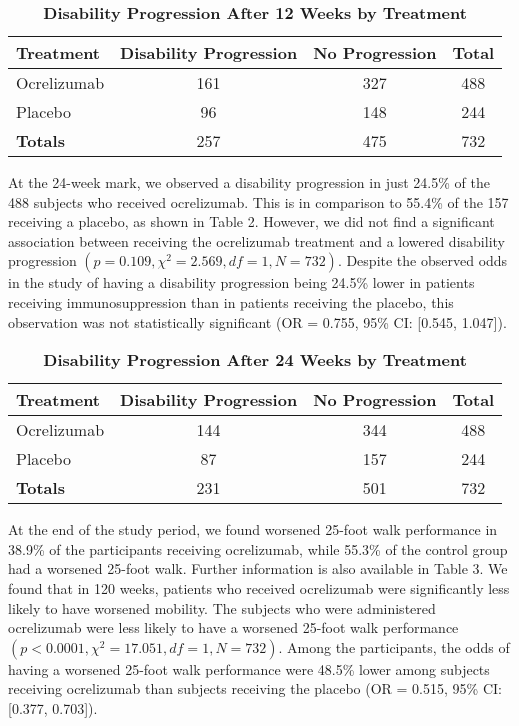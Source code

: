 \documentclass{article}
\begin{document}
	\begin{table}[h]
		\centering
		\footnotesize
		\caption{\textbf{Disability Progression After 12 Weeks by Treatment}}
		\renewcommand{\arraystretch}{1.2}
		\begin{tabular}{lcc|c}
			\toprule
			\textbf{Treatment} & \textbf{Disability Progression} & \textbf{No Progression} & \textbf{Total} \\
			\midrule
			Ocrelizumab & 161 & 327 & 488 \\
			Placebo & 96 & 148 & 244 \\
			\midrule
			\textbf{Totals} & 257 & 475 & 732 \\
			\bottomrule
		\end{tabular}
	\end{table}

	At the 24-week mark, we observed a disability progression in just 24.5\% of the 488 subjects who received ocrelizumab. This is in comparison to 55.4\% of the 157 receiving a placebo, as shown in Table 2. However, we did not find a significant association between receiving the ocrelizumab treatment and a lowered disability progression $(p = 0.109, \chi^2 = 2.569, df = 1, N = 732)$. Despite the observed odds in the study of having a disability progression being 24.5\% lower in patients receiving immunosuppression than in patients receiving the placebo, this observation was not statistically significant (OR = 0.755, 95\% CI: [0.545, 1.047]).

	\newpage

	\begin{table}[h]
		\centering
		\footnotesize
		\caption{\textbf{Disability Progression After 24 Weeks by Treatment}}
		\renewcommand{\arraystretch}{1.2}
		\begin{tabular}{lcc|c}
			\toprule
			\textbf{Treatment} & \textbf{Disability Progression} & \textbf{No Progression} & \textbf{Total} \\
			\midrule
			Ocrelizumab & 144 & 344 & 488 \\
			Placebo & 87 & 157 & 244 \\
			\midrule
			\textbf{Totals} & 231 & 501 & 732 \\
			\bottomrule
		\end{tabular}
	\end{table}

	At the end of the study period, we found worsened 25-foot walk performance in 38.9\% of the participants receiving ocrelizumab, while 55.3\% of the control group had a worsened 25-foot walk. Further information is also available in Table 3. We found that in 120 weeks, patients who received ocrelizumab were significantly less likely to have worsened mobility. The subjects who were administered ocrelizumab were less likely to have a worsened 25-foot walk performance $(p < 0.0001, \chi^2 = 17.051, df = 1, N = 732)$. Among the participants, the odds of having a worsened 25-foot walk performance were 48.5\% lower among subjects receiving ocrelizumab than subjects receiving the placebo (OR = 0.515, 95\% CI: [0.377, 0.703]).
\end{document}
